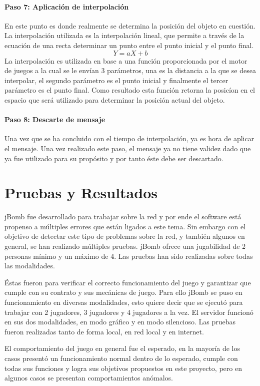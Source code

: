 \documentclass[a4paper,12pt,openany,oneside]{book}
\begin{document}
\subsubsection{Paso 7: Aplicación de interpolación}
En este punto es donde realmente se determina la posición del objeto en cuestión. La interpolación utilizada es la interpolación lineal, que permite a través de la ecuación de una recta determinar un punto entre el punto inicial y el punto final. 
$$Y = aX + b$$
La interpolación es utilizada en base a una función proporcionada por el motor de juegos a la cual se le envían 3 parámetros, una es la distancia a la que se desea interpolar, el segundo parámetro es el punto inicial y finalmente el tercer parámetro es el punto final. Como resultado esta función retorna la posicíon en el espacio que será utilizado para determinar la posición actual del objeto.
\subsubsection{Paso 8: Descarte de mensaje}
Una vez que se ha concluido con el tiempo de interpolación, ya es hora de aplicar el mensaje. Una vez realizado este paso, el mensaje ya no tiene validez dado que ya fue utilizado para su propósito y por tanto éste debe ser descartado.
\chapter{Pruebas y Resultados}
jBomb fue desarrollado para trabajar sobre la red y por ende el software está propenso a múltiples errores que están ligados a este tema. Sin embargo con el objetivo de detectar este tipo de problemas sobre la red, y también algunos en general, se han realizado múltiples pruebas.
jBomb ofrece una jugabilidad de 2 personas mínimo y un máximo de 4. Las pruebas han sido realizadas sobre todas las modalidades.

Éstas fueron para verificar el correcto funcionamiento del juego y garantizar que cumple con su contrato y sus mecánicas de juego. Para ello jBomb se puso en funcionamiento en diversas modalidades, esto quiere decir que se ejecutó para trabajar con 2 jugadores, 3 jugadores y 4 jugadores a la vez. El servidor funcionó en sus dos modalidades, en modo gráfico y en modo silencioso. Las pruebas fueron realizadas tanto de forma local, en red local y en internet.

El comportamiento del juego en general fue el esperado, en la mayoría de los casos presentó un funcionamiento normal dentro de lo esperado, cumple con todas sus funciones y logra sus objetivos propuestos en este proyecto, pero en algunos casos se presentan comportamientos anómalos.
\end{document}
